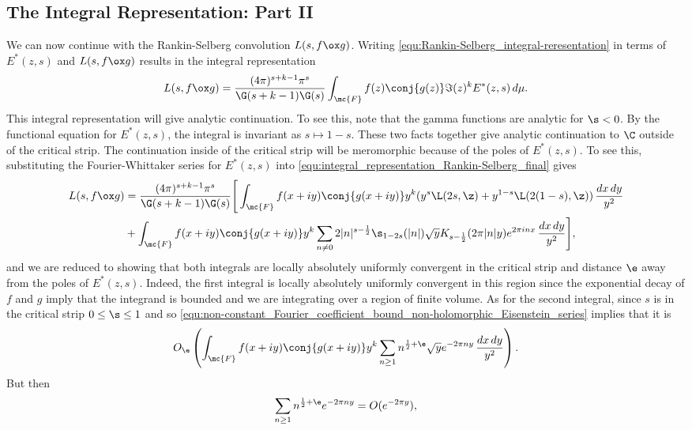     \subsection*{The Integral Representation: Part II}
      We can now continue with the Rankin-Selberg convolution $L(s,f \ox g)$. Writing \cref{equ:Rankin-Selberg_integral-reresentation} in terms of $E^{\ast}(z,s)$ and $L(s,f \ox g)$ results in the integral representation
      \begin{equation}\label{equ:integral_representation_Rankin-Selberg_final}
        L(s,f \ox g) = \frac{(4\pi)^{s+k-1}\pi^{s}}{\G(s+k-1)\G(s)}\int_{\mc{F}}f(z)\conj{g(z)}\Im(z)^{k}E^{\ast}(z,s)\,d\mu.
      \end{equation}
      This integral representation will give analytic continuation. To see this, note that the gamma functions are analytic for $\s < 0$. By the functional equation for $E^{\ast}(z,s)$, the integral is invariant as $s \mapsto 1-s$. These two facts together give analytic continuation to $\C$ outside of the critical strip. The continuation inside of the critical strip will be meromorphic because of the poles of $E^{\ast}(z,s)$. To see this, substituting the Fourier-Whittaker series for $E^{\ast}(z,s)$ into \cref{equ:integral_representation_Rankin-Selberg_final} gives
      \begin{align*}
        L(s,f \ox g) &= \frac{(4\pi)^{s+k-1}\pi^{s}}{\G(s+k-1)\G(s)}\Bigg[\int_{\mc{F}}f(x+iy)\conj{g(x+iy)}y^{k}(y^{s}\L(2s,\z)+y^{1-s}\L(2(1-s),\z))\,\frac{dx\,dy}{y^{2}} \\
        &+\int_{\mc{F}}f(x+iy)\conj{g(x+iy)}y^{k}\sum_{n \neq 0}2|n|^{s-\frac{1}{2}}\s_{1-2s}(|n|)\sqrt{y}K_{s-\frac{1}{2}}(2\pi|n|y)e^{2\pi inx}\,\frac{dx\,dy}{y^{2}}\Bigg],
      \end{align*}
      and we are reduced to showing that both integrals are locally absolutely uniformly convergent in the critical strip and distance $\e$ away from the poles of $E^{\ast}(z,s)$. Indeed, the first integral is locally absolutely uniformly convergent in this region since the exponential decay of $f$ and $g$ imply that the integrand is bounded and we are integrating over a region of finite volume. As for the second integral, since $s$ is in the critical strip $0 \le \s \le 1$ and so \cref{equ:non-constant_Fourier_coefficient_bound_non-holomorphic_Eisenstein_series} implies that it is
      \[
        O_{\e}\left(\int_{\mc{F}}f(x+iy)\conj{g(x+iy)}y^{k}\sum_{n \ge 1}n^{\frac{1}{2}+\e}\sqrt{y}e^{-2\pi ny}\,\frac{dx\,dy}{y^{2}}\right).
      \]
      But then
      \[
        \sum_{n \ge 1}n^{\frac{1}{2}+\e}e^{-2\pi ny} = O(e^{-2\pi y}),
      \]
